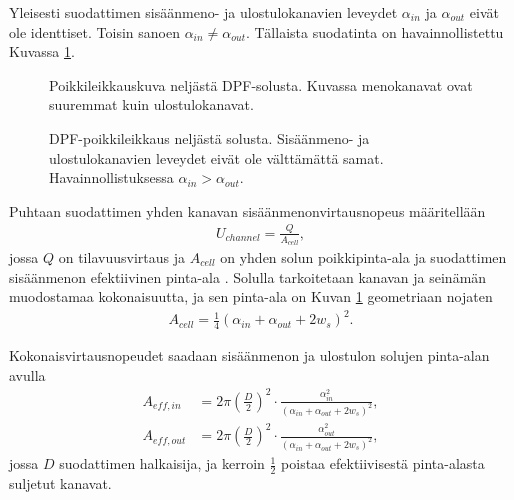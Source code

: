 Yleisesti suodattimen sisäänmeno- ja ulostulokanavien leveydet \(\alpha_{in}\) ja \(\alpha_{out}\) eivät ole identtiset. Toisin sanoen \(\alpha_{in} \neq \alpha_{out}\). Tällaista suodatinta on havainnollistettu Kuvassa \ref{fig:hac_dpf_clean}.
%
\begin{figure}[H]
    \centering 
               {Poikkileikkauskuva neljästä DPF-solusta. Kuvassa menokanavat ovat suuremmat kuin ulostulokanavat.}
    \caption{DPF-poikkileikkaus neljästä solusta. Sisäänmeno- ja ulostulokanavien leveydet eivät ole välttämättä samat. Havainnollistuksessa \(\alpha_{in}>\alpha_{out}\).}
    \label{fig:hac_dpf_clean}
\end{figure}

Puhtaan suodattimen yhden kanavan sisäänmenonvirtausnopeus määritellään 
\begin{align}\label{eq:flow_velocity_clean}
    U_{channel} = \frac{Q}{A_{cell}},
\end{align}
jossa \(Q\) on tilavuusvirtaus ja \(A_{cell}\) on  yhden solun poikkipinta-ala ja suodattimen sisäänmenon efektiivinen pinta-ala \cite{Konstandopoulos2000}. Solulla tarkoitetaan kanavan ja seinämän muodostamaa kokonaisuutta, ja sen pinta-ala on Kuvan \ref{fig:hac_dpf_clean}  geometriaan nojaten
\begin{align}
    A_{cell}=\frac{1}{4}(\alpha_{in}+\alpha_{out}+2w_s)^2.
\end{align}

Kokonaisvirtausnopeudet saadaan sisäänmenon ja ulostulon solujen pinta-alan avulla
\begin{align}
    A_{eff, in} &= 2 \pi \left(\frac{D}{2}\right)^2 \cdot \frac{\alpha_{in}^2}{(\alpha_{in}+\alpha_{out}+2w_s)^2}, \label{eq:area_eff_in} \\
    A_{eff, out} &= 2 \pi \left(\frac{D}{2}\right)^2 \cdot \frac{\alpha_{out}^2}{(\alpha_{in}+\alpha_{out}+2w_s)^2},\label{eq:area_eff_out}
\end{align}
jossa \(D \) suodattimen halkaisija, ja kerroin \(\frac{1}{2}\) poistaa efektiivisestä pinta-alasta suljetut kanavat.

